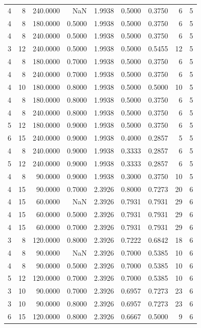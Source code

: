 \begin{tabular}{rrrrrrrrr}
4 & 8 & 240.0000 & NaN & 1.9938 & 0.5000 & 0.3750 & 6 & 5 \\
4 & 8 & 180.0000 & 0.5000 & 1.9938 & 0.5000 & 0.3750 & 6 & 5 \\
4 & 8 & 240.0000 & 0.5000 & 1.9938 & 0.5000 & 0.3750 & 6 & 5 \\
3 & 12 & 240.0000 & 0.5000 & 1.9938 & 0.5000 & 0.5455 & 12 & 5 \\
4 & 8 & 180.0000 & 0.7000 & 1.9938 & 0.5000 & 0.3750 & 6 & 5 \\
4 & 8 & 240.0000 & 0.7000 & 1.9938 & 0.5000 & 0.3750 & 6 & 5 \\
4 & 10 & 180.0000 & 0.8000 & 1.9938 & 0.5000 & 0.5000 & 10 & 5 \\
4 & 8 & 180.0000 & 0.8000 & 1.9938 & 0.5000 & 0.3750 & 6 & 5 \\
4 & 8 & 240.0000 & 0.8000 & 1.9938 & 0.5000 & 0.3750 & 6 & 5 \\
5 & 12 & 180.0000 & 0.9000 & 1.9938 & 0.5000 & 0.3750 & 6 & 5 \\
6 & 15 & 240.0000 & 0.9000 & 1.9938 & 0.4000 & 0.2857 & 5 & 5 \\
4 & 8 & 240.0000 & 0.9000 & 1.9938 & 0.3333 & 0.2857 & 6 & 5 \\
5 & 12 & 240.0000 & 0.9000 & 1.9938 & 0.3333 & 0.2857 & 6 & 5 \\
4 & 8 & 90.0000 & 0.9000 & 1.9938 & 0.3000 & 0.3750 & 10 & 5 \\
4 & 15 & 90.0000 & 0.7000 & 2.3926 & 0.8000 & 0.7273 & 20 & 6 \\
4 & 15 & 60.0000 & NaN & 2.3926 & 0.7931 & 0.7931 & 29 & 6 \\
4 & 15 & 60.0000 & 0.5000 & 2.3926 & 0.7931 & 0.7931 & 29 & 6 \\
4 & 15 & 60.0000 & 0.7000 & 2.3926 & 0.7931 & 0.7931 & 29 & 6 \\
3 & 8 & 120.0000 & 0.8000 & 2.3926 & 0.7222 & 0.6842 & 18 & 6 \\
4 & 8 & 90.0000 & NaN & 2.3926 & 0.7000 & 0.5385 & 10 & 6 \\
4 & 8 & 90.0000 & 0.5000 & 2.3926 & 0.7000 & 0.5385 & 10 & 6 \\
5 & 12 & 120.0000 & 0.7000 & 2.3926 & 0.7000 & 0.5385 & 10 & 6 \\
3 & 10 & 90.0000 & 0.7000 & 2.3926 & 0.6957 & 0.7273 & 23 & 6 \\
3 & 10 & 90.0000 & 0.8000 & 2.3926 & 0.6957 & 0.7273 & 23 & 6 \\
6 & 15 & 120.0000 & 0.8000 & 2.3926 & 0.6667 & 0.5000 & 9 & 6 \\

\end{tabular}
